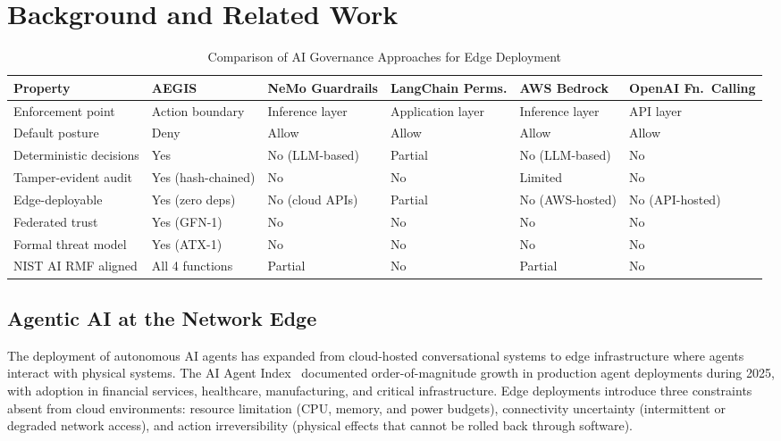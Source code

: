 \documentclass[journal]{IEEEtran}
\begin{document}
\section{Background and Related Work}

\begin{table}[t]
\centering
\caption{Comparison of AI Governance Approaches for Edge Deployment}
\label{tab:comparison}
\begin{tabularx}{\textwidth}{@{}l *{5}{>{\centering\arraybackslash}X} @{}}
\toprule
\textbf{Property} & \textbf{AEGIS} & \textbf{NeMo Guardrails} & \textbf{LangChain Perms.} & \textbf{AWS Bedrock} & \textbf{OpenAI Fn.\ Calling} \\
\midrule
Enforcement point & Action boundary & Inference layer & Application layer & Inference layer & API layer \\
Default posture & Deny & Allow & Allow & Allow & Allow \\
Deterministic decisions & Yes & No (LLM-based) & Partial & No (LLM-based) & No \\
Tamper-evident audit & Yes (hash-chained) & No & No & Limited & No \\
Edge-deployable & Yes (zero deps) & No (cloud APIs) & Partial & No (AWS-hosted) & No (API-hosted) \\
Federated trust & Yes (GFN-1) & No & No & No & No \\
Formal threat model & Yes (ATX-1) & No & No & No & No \\
NIST AI RMF aligned & All 4 functions & Partial & No & Partial & No \\
\bottomrule
\end{tabularx}
\end{table}

\subsection{Agentic AI at the Network Edge}

The deployment of autonomous AI agents has expanded from cloud-hosted conversational systems to edge infrastructure where agents interact with physical systems. The AI Agent Index~\cite{ai_agent_index} documented order-of-magnitude growth in production agent deployments during 2025, with adoption in financial services, healthcare, manufacturing, and critical infrastructure. Edge deployments introduce three constraints absent from cloud environments: resource limitation (CPU, memory, and power budgets), connectivity uncertainty (intermittent or degraded network access), and action irreversibility (physical effects that cannot be rolled back through software).
\end{document}
